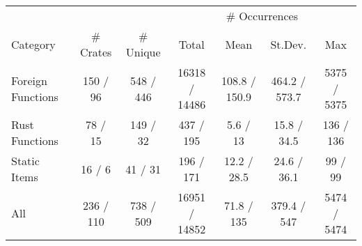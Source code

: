 \begin{tabular}{lcc|cccc}
  \hline
  & & & \multicolumn{4}{c}{\# Occurrences} \\
 Category & \# Crates & \# Unique & Total & Mean & St.Dev. & Max \\
 \hline
Foreign Functions & 150 / 96 & 548 / 446 & 16318 / 14486 & 108.8 / 150.9 & 464.2 / 573.7 & 5375 / 5375 \\ 
  Rust Functions & 78 / 15 & 149 / 32 & 437 / 195 & 5.6 / 13 & 15.8 / 34.5 & 136 / 136 \\ 
  Static Items & 16 / 6 & 41 / 31 & 196 / 171 & 12.2 / 28.5 & 24.6 / 36.1 & 99 / 99 \\ 
  All & 236 / 110 & 738 / 509 & 16951 / 14852 & 71.8 / 135 & 379.4 / 547 & 5474 / 5474 \\ 
   \hline
\end{tabular}

